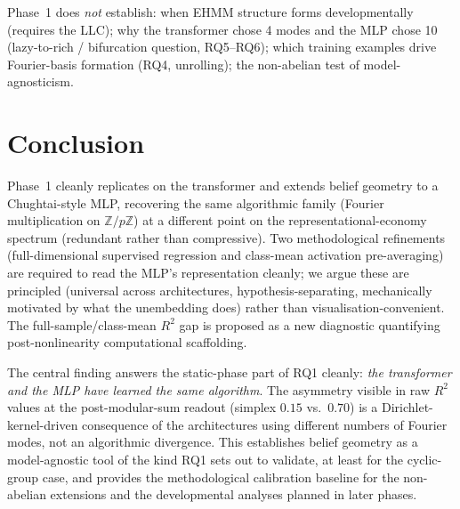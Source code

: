 \documentclass[11pt,a4paper]{article}
\begin{document}
Phase~1 does \emph{not} establish: when EHMM structure forms developmentally (requires the LLC); why the transformer chose 4 modes and the MLP chose 10 (lazy-to-rich / bifurcation question, RQ5--RQ6); which training examples drive Fourier-basis formation (RQ4, unrolling); the non-abelian test of model-agnosticism.

\section{Conclusion}

Phase~1 cleanly replicates \citet{poncini2025compmech} on the transformer and extends belief geometry to a Chughtai-style MLP, recovering the same algorithmic family (Fourier multiplication on $\mathbb{Z}/p\mathbb{Z}$) at a different point on the representational-economy spectrum (redundant rather than compressive). Two methodological refinements (full-dimensional supervised regression and class-mean activation pre-averaging) are required to read the MLP's representation cleanly; we argue these are principled (universal across architectures, hypothesis-separating, mechanically motivated by what the unembedding does) rather than visualisation-convenient. The full-sample/class-mean $R^2$ gap is proposed as a new diagnostic quantifying post-nonlinearity computational scaffolding.

The central finding answers the static-phase part of RQ1 cleanly: \emph{the transformer and the MLP have learned the same algorithm}. The asymmetry visible in raw $R^2$ values at the post-modular-sum readout (simplex $0.15$ vs.\ $0.70$) is a Dirichlet-kernel-driven consequence of the architectures using different numbers of Fourier modes, not an algorithmic divergence. This establishes belief geometry as a model-agnostic tool of the kind RQ1 sets out to validate, at least for the cyclic-group case, and provides the methodological calibration baseline for the non-abelian extensions and the developmental analyses planned in later phases.


\end{document}

